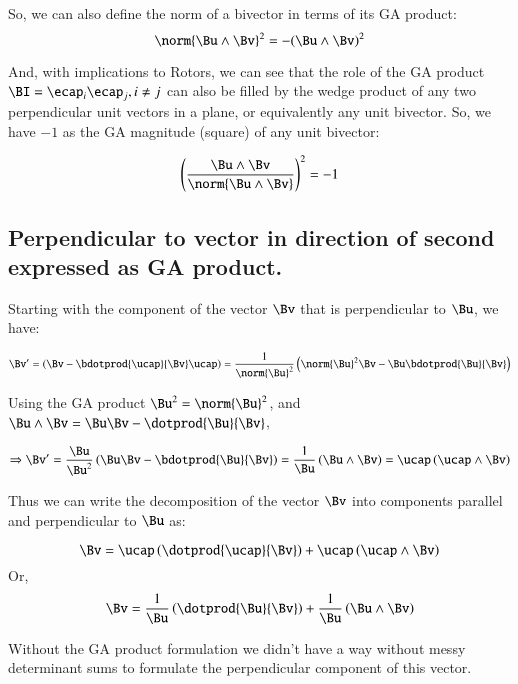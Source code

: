 So, we can also define the norm of a bivector in terms of its GA product:
\[
\norm{\Bu \wedge \Bv}^2 = -(\Bu \wedge \Bv)^2
\]

And, with implications to Rotors, we can see that the role of the GA product $\BI = \ecap_i \ecap_j, i \neq j$ can also be filled by the wedge product of any two perpendicular unit vectors in a plane, or equivalently any unit bivector.  So, we have $-1$ as the GA magnitude (square) of any unit bivector:

\[
\left(\frac{\Bu \wedge \Bv}
{
\norm{\Bu \wedge \Bv}
}\right)^2 = -1
\]

\subsection{Perpendicular to vector in direction of second expressed as GA product.}

Starting with the component of the vector $\Bv$ that is perpendicular to $\Bu$, we have:

\[
\Bv' = \left(\Bv - \bdotprod{\ucap}{\Bv} \ucap \right)
= {\frac{1}{\norm{\Bu}^2}}\left(\norm{\Bu}^2 \Bv - \Bu \bdotprod{\Bu}{\Bv}  \right)
\]

Using the GA product $\Bu^2 = \norm{\Bu}^2$, and $\Bu \wedge \Bv = \Bu \Bv - \dotprod{\Bu}{\Bv}$,

\[
\Rightarrow
\Bv' = \frac{\Bu}{\Bu^2} \left(\Bu \Bv - \bdotprod{\Bu}{\Bv} \right)
=
\frac{1}{\Bu} \left(\Bu \wedge \Bv \right)
=
\ucap \left(\ucap \wedge \Bv \right) 
\]

Thus we can write the decomposition of the vector $\Bv$ into components parallel and perpendicular to $\Bu$ as:

\[
\Bv = \ucap \left(\dotprod{\ucap}{\Bv}\right) + \ucap \left(\ucap \wedge \Bv \right)
\]
Or,
\[
\Bv = \frac{1}{\Bu} \left(\dotprod{\Bu}{\Bv}\right) + \frac{1}{\Bu} \left(\Bu \wedge \Bv \right)
\]

Without the GA product formulation we didn't have a way without messy determinant sums to formulate the perpendicular component of this vector.

